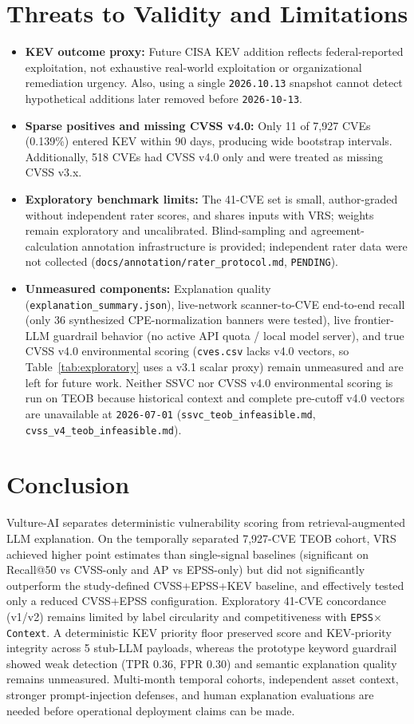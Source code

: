 \documentclass[conference]{IEEEtran}
\begin{document}
\section{Threats to Validity and Limitations}
\begin{itemize}
    \item \textbf{KEV outcome proxy:} Future CISA KEV addition reflects federal-reported exploitation, not exhaustive real-world exploitation or organizational remediation urgency. Also, using a single \texttt{2026.10.13} snapshot cannot detect hypothetical additions later removed before \texttt{2026-10-13}.
    \item \textbf{Sparse positives and missing CVSS v4.0:} Only 11 of 7,927 CVEs (0.139\%) entered KEV within 90 days, producing wide bootstrap intervals. Additionally, 518 CVEs had CVSS v4.0 only and were treated as missing CVSS v3.x.
    \item \textbf{Exploratory benchmark limits:} The 41-CVE set is small, author-graded without independent rater scores, and shares inputs with VRS; weights remain exploratory and uncalibrated. Blind-sampling and agreement-calculation annotation infrastructure is provided; independent rater data were not collected (\texttt{docs/annotation/rater\_protocol.md}, \texttt{PENDING}).
    \item \textbf{Unmeasured components:} Explanation quality (\texttt{explanation\_summary.json}), live-network scanner-to-CVE end-to-end recall (only 36 synthesized CPE-normalization banners were tested), live frontier-LLM guardrail behavior (no active API quota / local model server), and true CVSS v4.0 environmental scoring (\texttt{cves.csv} lacks v4.0 vectors, so Table~\ref{tab:exploratory} uses a v3.1 scalar proxy) remain unmeasured and are left for future work. Neither SSVC nor CVSS v4.0 environmental scoring is run on TEOB because historical context and complete pre-cutoff v4.0 vectors are unavailable at \texttt{2026-07-01} (\texttt{ssvc\_teob\_infeasible.md}, \texttt{cvss\_v4\_teob\_infeasible.md}).
\end{itemize}

\section{Conclusion}
Vulture-AI separates deterministic vulnerability scoring from retrieval-augmented LLM explanation. On the temporally separated 7,927-CVE TEOB cohort, VRS achieved higher point estimates than single-signal baselines (significant on Recall@50 vs CVSS-only and AP vs EPSS-only) but did not significantly outperform the study-defined CVSS+EPSS+KEV baseline, and effectively tested only a reduced CVSS+EPSS configuration. Exploratory 41-CVE concordance (v1/v2) remains limited by label circularity and competitiveness with \texttt{EPSS$\times$Context}. A deterministic KEV priority floor preserved score and KEV-priority integrity across 5 stub-LLM payloads, whereas the prototype keyword guardrail showed weak detection (TPR 0.36, FPR 0.30) and semantic explanation quality remains unmeasured. Multi-month temporal cohorts, independent asset context, stronger prompt-injection defenses, and human explanation evaluations are needed before operational deployment claims can be made.

\enlargethispage{4\baselineskip}


\end{document}

